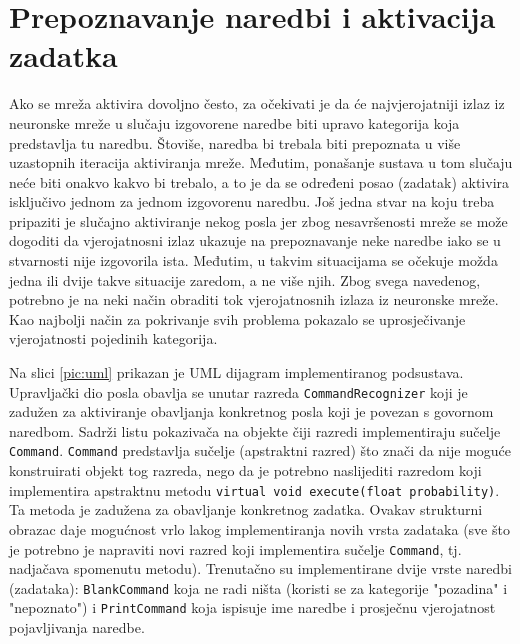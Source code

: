 \section{Prepoznavanje naredbi i aktivacija zadatka}
\label{sec:prepoy}

Ako se mreža aktivira dovoljno često, za očekivati je da će najvjerojatniji izlaz iz 
neuronske mreže u slučaju izgovorene naredbe biti upravo kategorija koja predstavlja tu naredbu. 
Štoviše, naredba bi trebala biti prepoznata u više uzastopnih iteracija aktiviranja mreže.
Međutim, ponašanje sustava u tom slučaju neće biti onakvo kakvo bi trebalo, a to je da se
određeni posao (zadatak) aktivira isključivo jednom za jednom izgovorenu naredbu. 
Još jedna stvar na koju treba pripaziti je slučajno aktiviranje nekog posla jer zbog
nesavršenosti mreže se može dogoditi da vjerojatnosni izlaz ukazuje na prepoznavanje neke
naredbe iako se u stvarnosti nije izgovorila ista. Međutim, u takvim situacijama se očekuje možda jedna ili dvije takve situacije zaredom,
a ne više njih. Zbog svega navedenog, potrebno je na neki način obraditi tok vjerojatnosnih
izlaza iz neuronske mreže. Kao najbolji način za pokrivanje svih problema pokazalo se 
uprosječivanje vjerojatnosti pojedinih kategorija. 

Na slici \ref{pic:uml} prikazan je UML dijagram implementiranog podsustava. Upravljački dio posla
obavlja se unutar razreda \texttt{CommandRecognizer} koji je zadužen za aktiviranje obavljanja 
konkretnog posla koji je povezan s govornom naredbom. 
Sadrži listu pokazivača na objekte čiji razredi implementiraju 
sučelje \texttt{Command}. \texttt{Command} predstavlja sučelje (apstraktni razred) što znači da
nije moguće konstruirati objekt tog razreda, nego da je potrebno naslijediti razredom koji 
implementira apstraktnu metodu \texttt{virtual void execute(float probability)}. Ta 
metoda je zadužena za obavljanje konkretnog zadatka. Ovakav strukturni
obrazac daje mogućnost vrlo lakog implementiranja novih vrsta zadataka (sve što je potrebno je 
napraviti novi razred koji implementira sučelje \texttt{Command}, tj. nadjačava
spomenutu metodu). Trenutačno su implementirane
dvije vrste naredbi (zadataka): \texttt{BlankCommand} koja ne radi ništa (koristi se za kategorije
"pozadina" i "nepoznato") i \texttt{PrintCommand} koja ispisuje ime naredbe i prosječnu 
vjerojatnost pojavljivanja naredbe.

